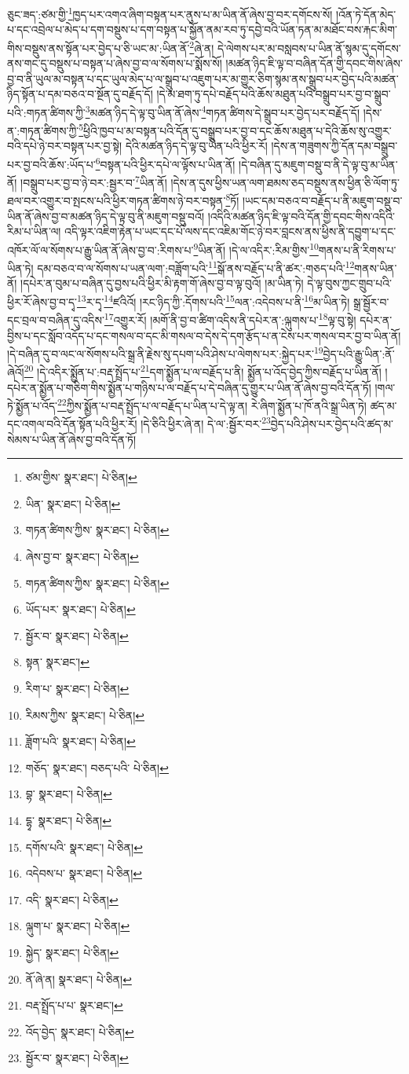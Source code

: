 ཅུང་ཟད་:ཙམ་གྱི་\footnote{ཙམ་གྱིས་  སྣར་ཐང་།  པེ་ཅིན། }ཁྱད་པར་འགའ་ཞིག་བསྟན་པར་ནུས་པ་མ་ཡིན་ནོ་ཞེས་བྱ་བར་དགོངས་སོ། །འོན་ཏེ་དོན་མེད་པ་དང་འབྲེལ་པ་མེད་པ་དག་བསྡུས་པ་དག་བསྟན་པ་སྐྱོན་ནམ་རབ་ཏུ་དབྱེ་བའི་ཡོན་ཏན་མ་མཐོང་བས་རྐང་མིག་གིས་བསྡུས་ནས་སྟོན་པར་བྱེད་པ་ཅི་ཡང་མ་:ཡིན་ནོ་\footnote{ཡིན་  སྣར་ཐང་།  པེ་ཅིན། }ཞེ་ན། དེ་ལེགས་པར་མ་བསླབས་པ་ཡིན་ནོ་སྙམ་དུ་དགོངས་ནས་གང་དུ་བསྡུས་པ་བསྟན་པ་ཞེས་བྱ་བ་ལ་སོགས་པ་སྨོས་སོ། །མཚན་ཉིད་ཇི་ལྟ་བ་བཞིན་དོན་གྱི་དབང་གིས་ཞེས་བྱ་བ་ནི་ཡུལ་མ་བསྟན་པ་དང་ཡུལ་མེད་པ་ལ་སྒྲུབ་པ་འཇུག་པར་མ་གྱུར་ཅིག་སྙམ་ནས་སྒྲུབ་པར་བྱེད་པའི་མཚན་ཉིད་སྟོན་པ་དམ་བཅའ་བ་སྔོན་དུ་བརྗོད་དོ། །དེ་མ་ཐག་ཏུ་དཔེ་བརྗོད་པའི་ཆོས་མཐུན་པའི་བསྒྲུབ་པར་བྱ་བ་སྒྲུབ་པའི་:གཏན་ཚིགས་ཀྱི་\footnote{གཏན་ཚིགས་ཀྱིས་  སྣར་ཐང་།  པེ་ཅིན། }མཚན་ཉིད་དེ་ལྟ་བུ་ཡིན་ནོ་ཞེས་\footnote{ཞེས་བྱ་བ་  སྣར་ཐང་།  པེ་ཅིན། }གཏན་ཚིགས་དེ་སྒྲུབ་པར་བྱེད་པར་བརྗོད་དོ། །དེས་ན་:གཏན་ཚིགས་ཀྱི་\footnote{གཏན་ཚིགས་ཀྱིས་  སྣར་ཐང་།  པེ་ཅིན། }ཕྱིའི་ཁྱབ་པ་མ་བསྟན་པའི་དོན་དུ་བསྒྲུབ་པར་བྱ་བ་དང་ཆོས་མཐུན་པ་དེའི་ཆོས་སུ་འགྱུར་བའི་དཔེ་ཉེ་བར་བསྟན་པར་བྱ་སྟེ། དེའི་མཚན་ཉིད་དེ་ལྟ་བུ་ཡིན་པའི་ཕྱིར་རོ། །དེས་ན་གཟུགས་ཀྱི་དོན་དམ་བསྒྲུབ་པར་བྱ་བའི་ཆོས་:ཡོད་པ་\footnote{ཡོད་པར་  སྣར་ཐང་།  པེ་ཅིན། }བསྟན་པའི་ཕྱིར་དཔེ་ལ་ལྟོས་པ་ཡིན་ནོ། །དེ་བཞིན་དུ་མཇུག་བསྡུ་བ་ནི་དེ་ལྟ་བུ་མ་ཡིན་ནོ། །བསྒྲུབ་པར་བྱ་བ་ཉེ་བར་:སྦྱར་བ་\footnote{སྦྱོར་བ་  སྣར་ཐང་།  པེ་ཅིན། }ཡིན་ནོ། །དེས་ན་དུས་ཕྱིས་ཡན་ལག་ཐམས་ཅད་བསྡུས་ནས་ཕྱིན་ཅི་ལོག་ཏུ་ཐལ་བར་འགྱུར་བ་སྤངས་པའི་ཕྱིར་གཏན་ཚིགས་ཉེ་བར་བསྟན་\footnote{སྟན་  སྣར་ཐང་། }ཏོ། །ཡང་དམ་བཅའ་བ་བརྗོད་པ་ནི་མཇུག་བསྡུ་བ་ཡིན་ནོ་ཞེས་བྱ་བ་མཚན་ཉིད་དེ་ལྟ་བུ་ནི་མཇུག་བསྡུ་བའོ། །འདིའི་མཚན་ཉིད་ཇི་ལྟ་བའི་དོན་གྱི་དབང་གིས་འདིའི་རིམ་པ་ཡིན་ལ། འདི་ལྟར་འཇིག་རྟེན་པ་ཡང་དང་པོ་ལས་དང་འཇིམ་གོང་ཉེ་བར་བླངས་ནས་ཕྱིས་ནི་དབྱུག་པ་དང་འཁོར་ལོ་ལ་སོགས་པ་རྒྱུ་ཡིན་ནོ་ཞེས་བྱ་བ་:རིགས་པ་\footnote{རིག་པ་  སྣར་ཐང་།  པེ་ཅིན། }ཡིན་ནོ། །དེ་ལ་འདིར་:རིམ་གྱིས་\footnote{རིམས་ཀྱིས་  སྣར་ཐང་།  པེ་ཅིན། }གནས་པ་ནི་རིགས་པ་ཡིན་ཏེ། དམ་བཅའ་བ་ལ་སོགས་པ་ཡན་ལག་:བཟློག་པའི་\footnote{ཟློག་པའི་  སྣར་ཐང་།  པེ་ཅིན། }སྒོ་ནས་བརྗོད་པ་ནི་ཚར་:གཅད་པའི་\footnote{གཅོད་  སྣར་ཐང་། བཅད་པའི་  པེ་ཅིན། }གནས་ཡིན་ནོ། །དཔེར་ན་བུམ་པ་བཞིན་དུ་བྱས་པའི་ཕྱིར་མི་རྟག་གོ་ཞེས་བྱ་བ་ལྟ་བུའོ། །མ་ཡིན་ཏེ། དེ་ལྟ་བུས་ཀྱང་གྲུབ་པའི་ཕྱིར་རོ་ཞེས་བྱ་བ་དྭ་\footnote{བྷ་  སྣར་ཐང་།  པེ་ཅིན། }ར་དྭ་\footnote{དྷྭ་  སྣར་ཐང་།  པེ་ཅིན། }ཛའིའོ། །རང་ཉིད་ཀྱི་:དོགས་པའི་\footnote{དགོས་པའི་  སྣར་ཐང་།  པེ་ཅིན། }ལན་:འདེབས་པ་ནི་\footnote{འདེབས་པ་  སྣར་ཐང་།  པེ་ཅིན། }མ་ཡིན་ཏེ། སྒྲ་སྦྱོར་བ་དང་བྲལ་བ་བཞིན་དུ་འདིས་\footnote{འདི་  སྣར་ཐང་།  པེ་ཅིན། }འགྱུར་རོ། །མགོ་ནི་བྱ་བ་ཚིག་འདིས་ནི་དཔེར་ན་:ལྐུགས་པ་\footnote{ལྐུག་པ་  སྣར་ཐང་།  པེ་ཅིན། }ལྟ་བུ་སྟེ། དཔེར་ན་བྱིས་པ་དང་སློབ་འདོད་པ་དང་གསལ་བ་དང་མི་གསལ་བ་དེས་དེ་དག་རྩོད་པ་ན་ངེས་པར་གསལ་བར་བྱ་བ་ཡིན་ནོ། །དེ་བཞིན་དུ་བ་ལང་ལ་སོགས་པའི་སྒྲ་ནི་རྗེས་སུ་དཔག་པའི་ཤེས་པ་ལེགས་པར་:སྐྱེད་པར་\footnote{སྐྱེད་  སྣར་ཐང་།  པེ་ཅིན། }བྱེད་པའི་རྒྱུ་ཡིན་:ནོ་ཞེའོ།\footnote{ནོ་ཞེ་ན།  སྣར་ཐང་།  པེ་ཅིན། } །དེ་འདིར་སྨྱོན་པ་:བརྡ་སྤྲོད་པ་\footnote{བརྡ་སྤྲོད་པ་པ་  སྣར་ཐང་། }དག་སྨྱོན་པ་ལ་བརྗོད་པ་ནི། སྨྱོན་པ་འོད་བྱེད་ཀྱིས་བརྗོད་པ་ཡིན་ནོ། །དཔེར་ན་སྨྱོན་པ་གཅིག་གིས་སྨྱོན་པ་གཉིས་པ་ལ་བརྗོད་པ་དེ་བཞིན་དུ་གྱུར་པ་ཡིན་ནོ་ཞེས་བྱ་བའི་དོན་ཏོ། །གལ་ཏེ་སྨྱོན་པ་འོད་\footnote{འོད་བྱེད་  སྣར་ཐང་།  པེ་ཅིན། }ཀྱིས་སྨྱོན་པ་བརྡ་སྤྲོད་པ་ལ་བརྗོད་པ་ཡིན་པ་དེ་ལྟ་ན། རེ་ཞིག་སྨྱོན་པ་ཁོ་ནའི་སྒྲ་ཡིན་ཏེ། ཚད་མ་དང་འགལ་བའི་དོན་སྟོན་པའི་ཕྱིར་རོ། །དེ་ཅིའི་ཕྱིར་ཞེ་ན། དེ་ལ་:སྦྱོར་བར་\footnote{སྦྱོར་བ་  སྣར་ཐང་།  པེ་ཅིན། }བྱེད་པའི་ཤེས་པར་བྱེད་པའི་ཚད་མ་སེམས་པ་ཡིན་ནོ་ཞེས་བྱ་བའི་དོན་ཏོ། 
